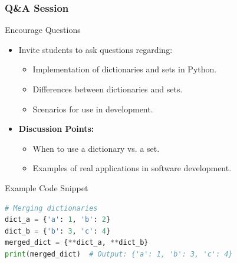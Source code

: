 \documentclass{beamer}
\begin{document}
\begin{frame}[fragile]
    \frametitle{Q\&A Session}
    \begin{block}{Encourage Questions}
        \begin{itemize}
            \item Invite students to ask questions regarding:
                \begin{itemize}
                    \item Implementation of dictionaries and sets in Python.
                    \item Differences between dictionaries and sets.
                    \item Scenarios for use in development.
                \end{itemize}
            \item \textbf{Discussion Points:}
                \begin{itemize}
                    \item When to use a dictionary vs. a set.
                    \item Examples of real applications in software development.
                \end{itemize}
        \end{itemize}
    \end{block}
    
    \begin{block}{Example Code Snippet}
        \begin{lstlisting}[language=Python]
# Merging dictionaries
dict_a = {'a': 1, 'b': 2}
dict_b = {'b': 3, 'c': 4}
merged_dict = {**dict_a, **dict_b}
print(merged_dict)  # Output: {'a': 1, 'b': 3, 'c': 4}
        \end{lstlisting}
    \end{block}
\end{frame}
\end{document}
